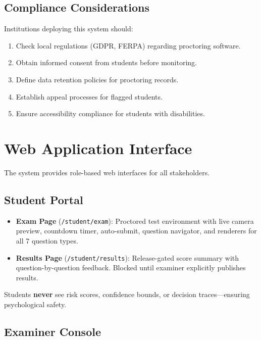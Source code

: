 \documentclass{article}
\begin{document}
\subsection{Compliance Considerations}

Institutions deploying this system should:
\begin{enumerate}
    \item Check local regulations (GDPR, FERPA) regarding proctoring software.
    \item Obtain informed consent from students before monitoring.
    \item Define data retention policies for proctoring records.
    \item Establish appeal processes for flagged students.
    \item Ensure accessibility compliance for students with disabilities.
\end{enumerate}

\section{Web Application Interface}
\label{sec:web_interface}

The system provides role-based web interfaces for all stakeholders.

\subsection{Student Portal}

\begin{itemize}
    \item \textbf{Exam Page} (\texttt{/student/exam}): Proctored test environment with live camera preview, countdown timer, auto-submit, question navigator, and renderers for all 7 question types.
    \item \textbf{Results Page} (\texttt{/student/results}): Release-gated score summary with question-by-question feedback. Blocked until examiner explicitly publishes results.
\end{itemize}

Students \textbf{never} see risk scores, confidence bounds, or decision traces---ensuring psychological safety.

\subsection{Examiner Console}
\end{document}
